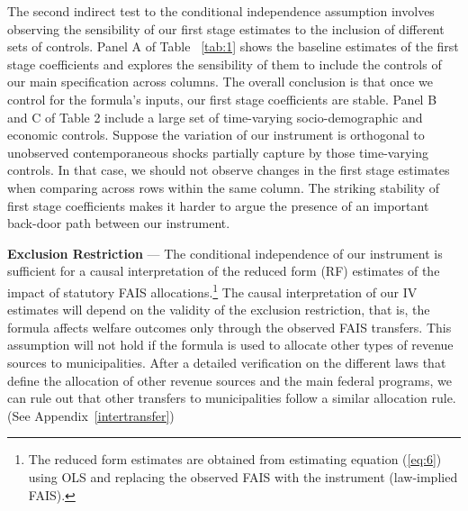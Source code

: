 \documentclass[dv_diss_main.tex]{subfiles}
\begin{document}
The second indirect test to the conditional independence assumption involves observing the sensibility of our first stage estimates to the inclusion of different sets of controls. Panel A of {Table} ~\ref{tab:1} shows the baseline estimates of the first stage coefficients and explores the sensibility of them to include the controls of our main specification across columns. The overall conclusion is that once we control for the formula's inputs, our first stage coefficients are stable. Panel B and C of Table 2 include a large set of time-varying socio-demographic and economic controls. Suppose the variation of our instrument is orthogonal to unobserved contemporaneous shocks partially capture by those time-varying controls. In that case, we should not observe changes in the first stage estimates when comparing across rows within the same column. The striking stability of first stage coefficients makes it harder to argue the presence of an important back-door path between our instrument.

\textbf{Exclusion Restriction }— The conditional independence of our instrument is sufficient for a causal interpretation of the reduced form (RF) estimates of the impact of statutory FAIS allocations.\footnote{The reduced form estimates are obtained from estimating equation (\ref{eq:6}) using OLS and replacing the observed FAIS with the instrument (law-implied FAIS).} The causal interpretation of our IV estimates will depend on the validity of the exclusion restriction, that is, the formula affects welfare outcomes only through the observed FAIS transfers. This assumption will not hold if the formula is used to allocate other types of revenue sources to municipalities. After a detailed verification on the different laws that define the allocation of other revenue sources and the main federal programs, we can rule out that other transfers to municipalities follow a similar allocation rule. (See  Appendix~\ref{intertransfer})
\end{document}
